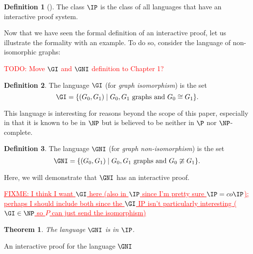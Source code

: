 \documentclass[english,12pt]{reedthesis}
\theoremstyle{plain}
\newtheorem{thm}{Theorem}[section]
\theoremstyle{definition}
\newtheorem{defn}[defn]{Definition}
\theoremstyle{remark}
\DeclarePairedDelimiter{\abs}{\lvert}{\rvert}
\newcommand{\TODO}[1]{\textcolor{red}{TODO: #1}}
\newcommand{\FIXME}[1]{\textcolor{red}{\ul{FIXME: #1}}}
\begin{document}
\begin{defn}[{\cite[Def.\ 4.2.5]{Go01}}]\label{def:ip}
  The class $\IP$ is the class of all languages that have an interactive proof
  system.
\end{defn}

Now that we have seen the formal definition of an interactive proof, let us
illustrate the formality with an example. To do so, consider the language of
non-isomorphic graphs:

\TODO{Move $\GI$ and $\GNI$ definition to Chapter 1?}
\begin{defn}\label{def:gi}
  The language $\GI$ (for \emph{graph isomorphism}) is the set
  \[
    \GI = \{(G_{0}, G_{1}) \mid G_{0}, G_{1} \text{ graphs and } G_{0} \cong G_{1}\}.
  \]
\end{defn}

This language is interesting for reasons beyond the scope of this paper,
especially in that it is known to be in $\NP$ but is believed to be neither in
$\P$ nor $\NP$-complete.

\begin{defn}\label{def:gni}
  The language $\GNI$ (for \emph{graph non-isomorphism}) is the set
  \[
    \GNI = \{(G_{0}, G_{1}) \mid G_{0}, G_{1} \text{ graphs and } G_{0} \ncong G_{1}\}.
  \]
\end{defn}

Here, we will demonstrate that $\GNI$ has an interactive proof.

\FIXME{I think I want $\GI$ here (also in $\IP$ since I'm pretty sure
  $\IP = co\IP$); perhaps I should include both since the $\GI$ IP isn't
  particularly interesting ($\GI \in \NP$ so $P$ can just send the isomorphism)}
\begin{thm}\label{thm:gni-ip}
  The language $\GNI$ is in $\IP$.
\end{thm}

\begin{algorithm}[htbp]
  \Accept\;
  \caption{An interactive proof for the language $\GNI$}\label{alg:gni-ip}
\end{algorithm}
\end{document}
